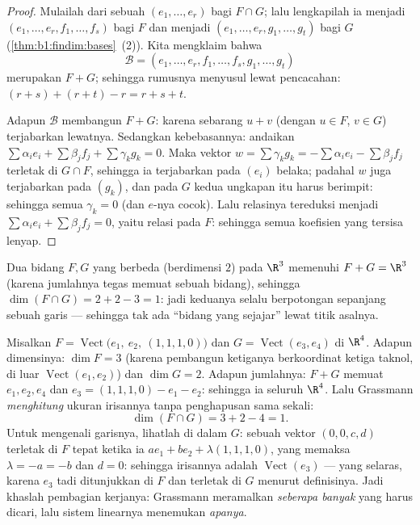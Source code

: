 \begin{proof}
Mulailah dari sebuah  $(e_1, \dots, e_r)$ bagi $F \cap G$; lalu lengkapilah ia
menjadi  $(e_1, \dots, e_r, f_1, \dots, f_s)$ bagi $F$ dan menjadi
 $(e_1, \dots, e_r, g_1, \dots, g_t)$ bagi $G$
(\cref{thm:b1:findim:bases}~(2)). Kita mengklaim bahwa
\[
\mathcal{B} = (e_1, \dots, e_r, f_1, \dots, f_s, g_1, \dots, g_t)
\]
merupakan  $F + G$; sehingga rumusnya menyusul lewat pencacahan: $(r + s) +
(r + t) - r = r + s + t$.

Adapun $\mathcal{B}$ membangun $F + G$: karena sebarang $u + v$ (dengan $u \in F$, $v \in G$)
terjabarkan lewatnya. Sedangkan kebebasannya: andaikan $\sum \alpha_i e_i + \sum
\beta_j f_j + \sum \gamma_k g_k = 0$. Maka vektor $w = \sum \gamma_k
g_k = -\sum\alpha_i e_i - \sum\beta_j f_j$ terletak di $G \cap F$, sehingga ia
terjabarkan pada $(e_i)$ belaka; padahal $w$ juga terjabarkan pada $(g_k)$, dan pada
 $G$ kedua ungkapan itu harus berimpit: sehingga semua
$\gamma_k = 0$ (dan  $e$-nya cocok). Lalu relasinya tereduksi
menjadi $\sum\alpha_i e_i + \sum\beta_j f_j = 0$, yaitu relasi pada 
$F$: sehingga semua koefisien yang tersisa lenyap.
\end{proof}

\begin{example}\label{ex:b1:findim:planes}
Dua bidang $F, G$ yang berbeda (berdimensi $2$) pada $\R^3$ memenuhi $F + G
= \R^3$ (karena jumlahnya tegas memuat sebuah bidang), sehingga $\dim(F \cap G) =
2 + 2 - 3 = 1$: jadi keduanya selalu berpotongan sepanjang sebuah garis --- sehingga tak ada
``bidang yang sejajar'' lewat titik asalnya.
\end{example}

\begin{example}
\label{ex:b1:findim:grassmannrun}
Misalkan $F = \operatorname{Vect}\bigl(e_1,\ e_2,\ (1,1,1,0)\bigr)$
dan $G = \operatorname{Vect}(e_3, e_4)$ di $\R^4$. Adapun dimensinya:
$\dim F = 3$ (karena pembangun ketiganya berkoordinat ketiga taknol,
di luar $\operatorname{Vect}(e_1, e_2)$) dan $\dim G = 2$. Adapun jumlahnya:
$F + G$ memuat $e_1, e_2, e_4$ dan $e_3 = (1,1,1,0) - e_1 -
e_2$: sehingga ia seluruh $\R^4$. Lalu Grassmann \emph{menghitung}
ukuran irisannya tanpa penghapusan sama sekali:
\[
\dim(F \cap G) = 3 + 2 - 4 = 1 .
\]
Untuk mengenali garisnya, lihatlah di dalam $G$: sebuah vektor $(0, 0, c, d)$
terletak di $F$ tepat ketika ia $a e_1 + b e_2 + \lambda(1,1,1,0)$,
yang memaksa $\lambda = -a = -b$ dan $d = 0$: sehingga irisannya adalah
$\operatorname{Vect}(e_3)$ --- yang selaras, karena $e_3$ tadi
ditunjukkan di $F$ dan terletak di $G$ menurut definisinya. Jadi khaslah
pembagian kerjanya: Grassmann meramalkan \emph{seberapa banyak} yang harus dicari,
lalu sistem linearnya menemukan \emph{apanya}.
\end{example}

